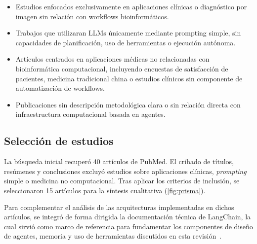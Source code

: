 \begin{itemize}
  \item Estudios enfocados exclusivamente en aplicaciones clínicas o diagnóstico por imagen sin relación con workflows bioinformáticos.
  \item Trabajos que utilizaran LLMs únicamente mediante prompting simple, sin capacidades de planificación, uso de herramientas o ejecución autónoma.
  \item Artículos centrados en aplicaciones médicas no relacionadas con bioinformática computacional, incluyendo encuestas de satisfacción de pacientes, medicina tradicional china o estudios clínicos sin componente de automatización de workflows.
  \item Publicaciones sin descripción metodológica clara o sin relación directa con infraestructura computacional basada en agentes.
\end{itemize}

\subsection{Selección de estudios}

La búsqueda inicial recuperó 40 artículos de PubMed. El cribado de títulos,
resúmenes y conclusiones excluyó estudios sobre aplicaciones clínicas,
\textit{prompting} simple o medicina no computacional. Tras aplicar los
criterios de inclusión, se seleccionaron 15 artículos para la síntesis
cualitativa (\cref{fig:prisma}).

Para complementar el análisis de las arquitecturas implementadas en dichos
artículos, se integró de forma dirigida la documentación técnica de LangChain,
la cual sirvió como marco de referencia para fundamentar los componentes de
diseño de agentes, memoria y uso de herramientas discutidos en esta
revisión~\citep{LangChainAgents2026,LangChainMemory2026,LangChainTools2026}.

